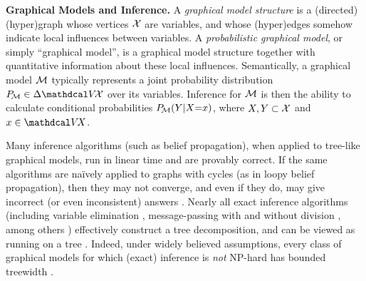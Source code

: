 \textbf{Graphical Models and Inference.}
A \emph{graphical model structure}
is a (directed) (hyper)graph whose vertices $\X$ are variables, and whose (hyper)edges 
somehow
indicate local influences between variables.
A \emph{probabilistic graphical model},
or simply  ``graphical model'',
is a
graphical model structure
together with quantitative information about these local influences.
Semantically,
a graphical model $\cal M$
typically
represents a joint probability distribution $\Pr_{\!\cal M}
 \in \Delta \V\!\X$ over its variables.
Inference for $\cal M$ is then the ability to calculate conditional probabilities
 $\Pr_{\!\cal M}(Y|X{=}x)$,
where $X,Y \subset \X$ and $x \in \V\! X$. 

Many inference algorithms (such as belief propagation),
when applied to tree-like graphical models,
run in linear time and are provably correct.
If the same algorithms are na{\"i}vely applied to graphs with cycles (as in loopy belief propagation),
then they may not converge, and even if they do,
may give incorrect (or even inconsistent) answers
\parencite{wainwright2008graphical}.
Nearly all exact inference algorithms
(including variable elimination  \parencite{bertele1972nonserial},
 message-passing with \parencite{lauritzen1988local}
    and without division \parencite{shafer1990probability},
    among others \parencite{wainwright2003tree})
effectively construct a tree decomposition, and can be
viewed as running on a tree \parencite[\S9-11]{koller2009probabilistic}.
Indeed,
under widely believed assumptions,
every class of graphical models
for which (exact) inference is \emph{not} NP-hard
has bounded treewidth
\parencite{chandrasekaran2012complexity}.

